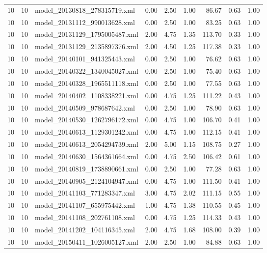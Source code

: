 \begin{table}[ht]
\begin{tabular}{rrlrrrrrr}
   10 &  10 & model\_20130818\_278315719.xml & 0.00 & 2.50 & 1.00 & 86.67 & 0.63 & 1.00 \\ 
   10 &  10 & model\_20131112\_990013628.xml & 0.00 & 2.50 & 1.00 & 83.25 & 0.63 & 1.00 \\ 
   10 &  10 & model\_20131129\_1795005487.xml & 2.00 & 4.75 & 1.35 & 113.70 & 0.33 & 1.00 \\ 
   10 &  10 & model\_20131129\_2135897376.xml & 2.00 & 4.50 & 1.25 & 117.38 & 0.33 & 1.00 \\ 
   10 &  10 & model\_20140101\_941325443.xml & 0.00 & 2.50 & 1.00 & 76.62 & 0.63 & 1.00 \\ 
   10 &  10 & model\_20140322\_1340045027.xml & 0.00 & 2.50 & 1.00 & 75.40 & 0.63 & 1.00 \\ 
   10 &  10 & model\_20140328\_1965511118.xml & 0.00 & 2.50 & 1.00 & 77.55 & 0.63 & 1.00 \\ 
   10 &  10 & model\_20140402\_1108338221.xml & 0.00 & 4.75 & 1.25 & 111.22 & 0.43 & 1.00 \\ 
   10 &  10 & model\_20140509\_978687642.xml & 0.00 & 2.50 & 1.00 & 78.90 & 0.63 & 1.00 \\ 
   10 &  10 & model\_20140530\_1262796172.xml & 0.00 & 4.75 & 1.00 & 106.70 & 0.41 & 1.00 \\ 
   10 &  10 & model\_20140613\_1129301242.xml & 0.00 & 4.75 & 1.00 & 112.15 & 0.41 & 1.00 \\ 
   10 &  10 & model\_20140613\_2054294739.xml & 2.00 & 5.00 & 1.15 & 108.75 & 0.27 & 1.00 \\ 
   10 &  10 & model\_20140630\_1564361664.xml & 0.00 & 4.75 & 2.50 & 106.42 & 0.61 & 1.00 \\ 
   10 &  10 & model\_20140819\_1738890661.xml & 0.00 & 2.50 & 1.00 & 77.28 & 0.63 & 1.00 \\ 
   10 &  10 & model\_20140905\_2124104947.xml & 0.00 & 4.75 & 1.00 & 111.50 & 0.41 & 1.00 \\ 
   10 &  10 & model\_20141103\_771283347.xml & 3.00 & 4.75 & 2.02 & 111.15 & 0.55 & 1.00 \\ 
   10 &  10 & model\_20141107\_655975442.xml & 1.00 & 4.75 & 1.38 & 110.55 & 0.45 & 1.00 \\ 
   10 &  10 & model\_20141108\_202761108.xml & 0.00 & 4.75 & 1.25 & 114.33 & 0.43 & 1.00 \\ 
   10 &  10 & model\_20141202\_104116345.xml & 2.00 & 4.75 & 1.68 & 108.00 & 0.39 & 1.00 \\ 
   10 &  10 & model\_20150411\_1026005127.xml & 2.00 & 2.50 & 1.00 & 84.88 & 0.63 & 1.00 \\ 

\end{tabular}
\end{table}
